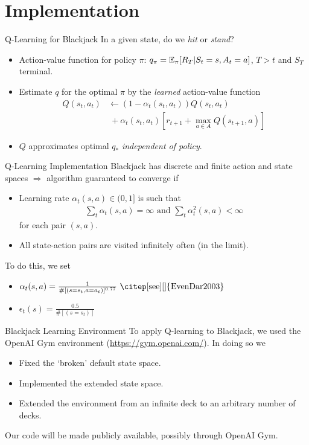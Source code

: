 \section{Implementation}

\begin{frame}{Q-Learning for Blackjack}
In a given state, do we \emph{hit} or \emph{stand}? 
\begin{itemize}
  \item Action-value function for policy $\pi$: $q_{\pi} = \mathbb{E}_{\pi}[R_{T} | S_t = s, A_t = a]$, $T>t$ and $S_T$ terminal.
  \item Estimate $q$ for the optimal $\pi$ by the \emph{learned} action-value function
    \begin{align*}
      Q(s_t,a_t)  &\leftarrow (1-\alpha_t(s_t,a_t))Q(s_t,a_t) \\
                  &~+ \alpha_t(s_t,a_t)[ r_{t+1} + \max_{a \in A} Q(s_{t+1},a) ]
    \end{align*}
  \item $Q$ approximates optimal $q_*$ \emph{independent of policy}.
\end{itemize}
\end{frame}

\begin{frame}{Q-Learning Implementation}
Blackjack has discrete and finite action and state spaces $\Rightarrow$
algorithm guaranteed to converge if
\begin{itemize}
        \item Learning rate $\alpha_t(s,a) \in (0, 1]$ is such that
          \begin{align*}
            \sum_t \alpha_t(s,a) = \infty \text{ and } \sum_t \alpha^2_t(s,a) < \infty
          \end{align*}
          for each pair $(s, a)$.
        \item All state-action pairs are visited infinitely often (in the limit).
\end{itemize}
To do this, we set
\begin{itemize}
  \item $\alpha_t(s,a) = \frac{1}{\#[(s=s_t,a=a_t)]^{0.77}} \text{ \citep[see][]{EvenDar2003}}$
  \item $\epsilon_t(s) = \frac{0.5}{\#[(s=s_t)]}$ 
\end{itemize}
\end{frame}

\begin{frame}{Blackjack Learning Environment}
To apply Q-learning to Blackjack, we used the OpenAI Gym environment (\url{https://gym.openai.com/}).
In doing so we
\begin{itemize}
  \item Fixed the `broken' default state space.
  \item Implemented the extended state space.
  \item Extended the environment from an infinite deck to an arbitrary number of decks.
\end{itemize}
Our code will be made publicly available, possibly through OpenAI Gym.
\end{frame}